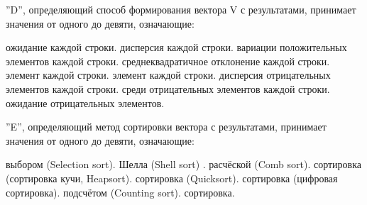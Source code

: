 {\begin{enumerate}
\begin{itemize}
			\end{itemize}
	\end{enumerate}
	 ''D'', определяющий способ формирования вектора V с результатами, принимает значения от одного до девяти, означающие:
	\begin{enumerate}
		 ожидание каждой строки.
		 дисперсия каждой строки.
		 вариации положительных элементов каждой строки.
		 среднеквадратичное отклонение каждой строки.
		 элемент каждой строки.
		 элемент каждой строки.
		 дисперсия отрицательных элементов каждой строки.
		 среди отрицательных элементов каждой строки.
		 ожидание отрицательных элементов.
	\end{enumerate}
	 ''E'', определяющий метод сортировки вектора с результатами, принимает значения от одного до девяти, означающие:
	\begin{enumerate}
		 выбором (Selection sort).
		 Шелла (Shell sort) .
		 расчёской (Comb sort).
		 сортировка (сортировка кучи, Heapsort).
		 сортировка (Quicksort).
		 сортировка (цифровая сортировка).
		 подсчётом (Counting sort).
		 сортировка.
	\end{enumerate}
}